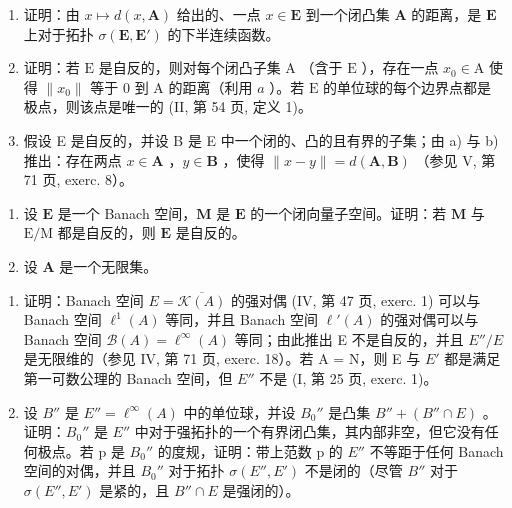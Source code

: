 \begin{enumerate}
\def\labelenumi{\alph{enumi})}
\item
  证明：由 \(x \mapsto d(x, \mathbf{A})\) 给出的、一点 \(x \in \mathbf{E}\) 到一个闭凸集 \(\mathbf{A}\) 的距离，是 \(\mathbf{E}\) 上对于拓扑 \(\sigma(\mathbf{E}, \mathbf{E}')\) 的下半连续函数。
\item
  证明：若 \(\mathrm{E}\) 是自反的，则对每个闭凸子集 \(\mathrm{A}\) （含于 \(\mathrm{E}\) ），存在一点 \(x_0 \in \mathrm{A}\) 使得 \(\| x_0 \|\) 等于 0 到 \(\mathrm{A}\) 的距离（利用 \(a\) ）。若 \(\mathrm{E}\) 的单位球的每个边界点都是极点，则该点是唯一的 (II, 第 54 页, 定义 1)。
\item
  假设 E 是自反的，并设 B 是 E 中一个闭的、凸的且有界的子集；由 a) 与 b) 推出：存在两点 \(x \in \mathbf{A}\) ，\(y \in \mathbf{B}\) ，使得 \(\| x - y \| = d(\mathbf{A}, \mathbf{B})\) （参见 V, 第 71 页, exerc. 8）。
\end{enumerate}

\begin{enumerate}
\def\labelenumi{\arabic{enumi})}
\setcounter{enumi}{12}
\item
  设 \(\mathbf{E}\) 是一个 Banach 空间，\(\mathbf{M}\) 是 \(\mathbf{E}\) 的一个闭向量子空间。证明：若 \(\mathbf{M}\) 与 \(\mathrm{E / M}\) 都是自反的，则 \(\mathbf{E}\) 是自反的。
\item
  设 \(\mathbf{A}\) 是一个无限集。
\end{enumerate}

\begin{enumerate}
\def\labelenumi{\alph{enumi})}
\tightlist
\item
  证明：Banach 空间 \(E = \overline{\mathcal{K}(A)}\) 的强对偶 (IV, 第 47 页, exerc. 1) 可以与 Banach 空间 \(\ell^{1}(A)\) 等同，并且 Banach 空间 \(\ell'(A)\) 的强对偶可以与 Banach 空间 \(\mathcal{B}(A) = \ell^{\infty}(A)\) 等同；由此推出 E 不是自反的，并且 \(E''/E\) 是无限维的（参见 IV, 第 71 页, exerc. 18）。若 A = N，则 E 与 \(E'\) 都是满足第一可数公理的 Banach 空间，但 \(E''\) 不是 (I, 第 25 页, exerc. 1)。
\item
  设 \(B''\) 是 \(E'' = \ell^{\infty}(A)\) 中的单位球，并设 \(B_{0}''\) 是凸集 \(B'' + (B'' \cap E)\) 。证明：\(B_{0}''\) 是 \(E''\) 中对于强拓扑的一个有界闭凸集，其内部非空，但它没有任何极点。若 p 是 \(B_{0}''\) 的度规，证明：带上范数 p 的 \(E''\) 不等距于任何 Banach 空间的对偶，并且 \(B_{0}''\) 对于拓扑 \(\sigma(E'', E')\) 不是闭的（尽管 \(B''\) 对于 \(\sigma(E'', E')\) 是紧的，且 \(B'' \cap E\) 是强闭的）。
\end{enumerate}


